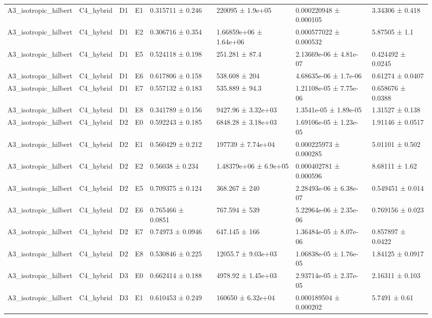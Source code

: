 \begin{table}
\begin{tabular}{lllllllll}
A3\_isotropic\_hilbert & C4\_hybrid & D1 & E1 & 0.315711 ± 0.246 &  & 220095 ± 1.9e+05 & 0.000220948 ± 0.000105 & 3.34306 ± 0.418 \\
A3\_isotropic\_hilbert & C4\_hybrid & D1 & E2 & 0.306716 ± 0.354 &  & 1.66859e+06 ± 1.64e+06 & 0.000577022 ± 0.000532 & 5.87505 ± 1.1 \\
A3\_isotropic\_hilbert & C4\_hybrid & D1 & E5 & 0.524118 ± 0.198 &  & 251.281 ± 87.4 & 2.13669e-06 ± 4.81e-07 & 0.424492 ± 0.0245 \\
A3\_isotropic\_hilbert & C4\_hybrid & D1 & E6 & 0.617806 ± 0.158 &  & 538.608 ± 204 & 4.68635e-06 ± 1.7e-06 & 0.61274 ± 0.0407 \\
A3\_isotropic\_hilbert & C4\_hybrid & D1 & E7 & 0.557132 ± 0.183 &  & 535.889 ± 94.3 & 1.21108e-05 ± 7.75e-06 & 0.658676 ± 0.0388 \\
A3\_isotropic\_hilbert & C4\_hybrid & D1 & E8 & 0.341789 ± 0.156 &  & 9427.96 ± 3.32e+03 & 1.3541e-05 ± 1.89e-05 & 1.31527 ± 0.138 \\
A3\_isotropic\_hilbert & C4\_hybrid & D2 & E0 & 0.592243 ± 0.185 &  & 6848.28 ± 3.18e+03 & 1.69106e-05 ± 1.23e-05 & 1.91146 ± 0.0517 \\
A3\_isotropic\_hilbert & C4\_hybrid & D2 & E1 & 0.560429 ± 0.212 &  & 197739 ± 7.74e+04 & 0.000225973 ± 0.000285 & 5.01101 ± 0.502 \\
A3\_isotropic\_hilbert & C4\_hybrid & D2 & E2 & 0.56038 ± 0.234 &  & 1.48379e+06 ± 6.9e+05 & 0.000402781 ± 0.000596 & 8.68111 ± 1.62 \\
A3\_isotropic\_hilbert & C4\_hybrid & D2 & E5 & 0.709375 ± 0.124 &  & 368.267 ± 240 & 2.28493e-06 ± 6.38e-07 & 0.549451 ± 0.014 \\
A3\_isotropic\_hilbert & C4\_hybrid & D2 & E6 & 0.765466 ± 0.0851 &  & 767.594 ± 539 & 5.22964e-06 ± 2.35e-06 & 0.769156 ± 0.023 \\
A3\_isotropic\_hilbert & C4\_hybrid & D2 & E7 & 0.74973 ± 0.0946 &  & 647.145 ± 166 & 1.36484e-05 ± 8.07e-06 & 0.857897 ± 0.0422 \\
A3\_isotropic\_hilbert & C4\_hybrid & D2 & E8 & 0.530846 ± 0.225 &  & 12055.7 ± 9.03e+03 & 1.06838e-05 ± 1.76e-05 & 1.84125 ± 0.0917 \\
A3\_isotropic\_hilbert & C4\_hybrid & D3 & E0 & 0.662414 ± 0.188 &  & 4978.92 ± 1.45e+03 & 2.93714e-05 ± 2.37e-05 & 2.16311 ± 0.103 \\
A3\_isotropic\_hilbert & C4\_hybrid & D3 & E1 & 0.610453 ± 0.249 &  & 160650 ± 6.32e+04 & 0.000189504 ± 0.000202 & 5.7491 ± 0.61 \\

\end{tabular}
\end{table}
